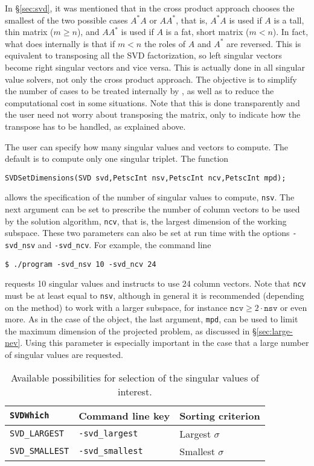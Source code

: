 In \S\ref{sec:svd}, it was mentioned that in \slepc the cross product approach chooses the smallest of the two possible cases $A^*A$ or $AA^*$, that is, $A^*A$ is used if $A$ is a tall, thin matrix ($m\geq n$), and $AA^*$ is used if $A$ is a fat, short matrix ($m<n$). In fact, what \slepc does internally is that if $m<n$ the roles of $A$ and $A^*$ are reversed. This is equivalent to transposing all the SVD factorization, so left singular vectors become right singular vectors and vice versa. This is actually done in all singular value solvers, not only the cross product approach. The objective is to simplify the number of cases to be treated internally by \slepc, as well as to reduce the computational cost in some situations. Note that this is done transparently and the user need not worry about transposing the matrix, only to indicate how the transpose has to be handled, as explained above.

The user can specify how many singular values and vectors to compute. The default is to compute only one singular triplet. The function
	\begin{Verbatim}[fontsize=\small]
	SVDSetDimensions(SVD svd,PetscInt nsv,PetscInt ncv,PetscInt mpd);
	\end{Verbatim}
allows the specification of the number of singular values to compute, \texttt{nsv}. The next argument can be set to prescribe the number of column vectors to be used by the solution algorithm, \texttt{ncv}, that is, the largest dimension of the working subspace. These two parameters can also be set at run time with the options \Verb!-svd_nsv! and \Verb!-svd_ncv!. For example, the command line
\begin{Verbatim}[fontsize=\small]
	$ ./program -svd_nsv 10 -svd_ncv 24
\end{Verbatim}
requests 10 singular values and instructs to use 24 column vectors. Note that \texttt{ncv} must be at least equal to \texttt{nsv}, although in general it is recommended (depending on the method) to work with a larger subspace, for instance $\mathtt{ncv}\geq2\cdot\mathtt{nsv}$ or even more.
As in the case of the  object, the last argument, \texttt{mpd}, can be used to limit the maximum dimension of the projected problem, as discussed in \S\ref{sec:large-nev}. Using this parameter is especially important in the case that a large number of singular values are requested.

\begin{table}
\centering
{\small \begin{tabular}{lll}
\texttt{SVDWhich}                  & Command line key                   & Sorting criterion \\\hline
\texttt{SVD\_LARGEST}   & \texttt{-svd\_largest}  & Largest $\sigma$ \\
\texttt{SVD\_SMALLEST}  & \texttt{-svd\_smallest} & Smallest $\sigma$ \\\hline
\end{tabular} }
\caption{\label{tab:whichsvd}Available possibilities for selection of the singular values of interest.}
\end{table}

